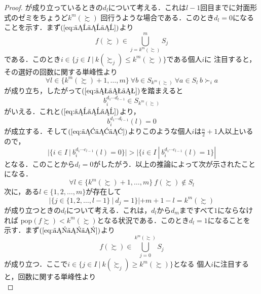 \documentclass[dvipdfmx]{jsarticle}
\begin{document}
\begin{proof}
  が成り立っているときの$d_l$について考える．これは$l-1$回目までに対面形式のゼミをちょうど$k^m(\succsim)$
  回行うような場合である．このとき$d_l=0$になることを示す．まず$(\ref{eq:えええ})$より
  \begin{equation}\label{eq:おおお}
    f(\succsim) \in \bigcup_{j=k^m(\succsim)}^{m}S_j
  \end{equation}
  である．このとき$i \in \{ j \in I \ | \ k(\succsim_j) \leq k^m(\succsim)\}$である個人$i$に
  注目すると，その選好の回数に関する単峰性より
  \begin{equation*}
    \forall l \in \{k^m(\succsim)+1, \ldots, m\} \ \forall b \in S_{k^m(\succsim)} \ 
    \forall a \in S_l \ b \succ_i a
  \end{equation*}
  が成り立ち，したがって$(\ref{eq:おおお})$を踏まえると
  \begin{equation*}
    b_{i}^{d_1 \cdots d_{l-1}} \in S_{k^m(\succsim)}
  \end{equation*}
  がいえる．これと$(\ref{eq:えええ})$より，
  \begin{equation*}
    b_{i}^{d_1 \cdots d_{l-1}}(l) = 0
  \end{equation*}
  が成立する．そして$(\ref{eq:あああ})$よりこのような個人$i$は$\frac{n}{2}+1$人以上いるので，
  \begin{equation*}
    |\{i \in I \ | \ b_i^{d_1 \cdots c_{l-1}}(l) = 0\}| >
    |\{i \in I \ | \ b_i^{d_1 \cdots c_{l-1}}(l) = 1\}|
  \end{equation*}
  となる．このことから$d_l=0$がしたがう．以上の推論によって次が示されたことになる．
  \begin{equation}\label{eq:ききき}
    \forall l \in \{k^m(\succsim)+1, \ldots, m\} \ f(\succsim) \notin S_l
  \end{equation}
  次に，ある$l \in \{1,2, \ldots, m\}$が存在して
  \begin{equation}\label{eq:かかか}
    |\{j \in \{1,2, \ldots, l-1\} \ | \ d_j=1 \}| + m + 1 -  l = k^m(\succsim)
  \end{equation}
  が成り立つときの$d_l$について考える．これは，$d_l$から$d_m$まですべて$1$にならなければ
  $\mathrm{pop}(f\succsim) < k^m(\succsim)$となる状況である．このとき$d_l=1$になることを
  示す．まず$(\ref{eq:かかか})$より
  \begin{equation}\label{eq:けけけ}
    f(\succsim) \in \bigcup_{j=0}^{k^m(\succsim)} S_j
  \end{equation}
  が成り立つ．ここで$i \in \{ j \in I \ | \ k(\succsim_j) \geq k^m(\succsim) \}$となる
  個人$i$に注目すると，回数に関する単峰性より
  \begin{equation*}

\end{equation*}
\end{proof}
\end{document}
